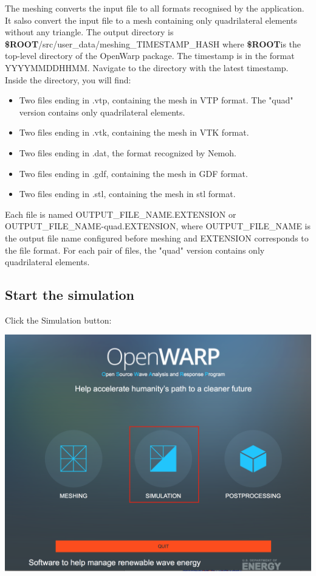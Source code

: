 \documentclass[12pt]{article}
\newcommand{\ROOT}{{\textbf{\$ROOT}}}
\begin{document}
	The meshing converts the input file to all formats recognised by the application. It salso convert the input file to a mesh containing only quadrilateral elements without any triangle.
The output directory is \ROOT/src/user_data/meshing_TIMESTAMP_HASH where 
\ROOT is the top-level directory of the OpenWarp package.
The timestamp is in the format YYYYMMDDHHMM. Navigate to the directory with the latest timestamp. Inside the directory, you will find:
\begin{itemize}
	\item Two files ending in .vtp, containing the mesh in VTP format. The "quad" version contains only quadrilateral elements.
	\item Two files ending in .vtk, containing the mesh in VTK format. 
	\item Two files ending in .dat, the format recognized by Nemoh. 
	
	\item 
	Two files ending in .gdf, containing the mesh in GDF format. 
	\item Two files ending in .stl, containing the mesh in stl format.
\end{itemize}

Each file is named OUTPUT_FILE_NAME.EXTENSION or OUTPUT_FILE_NAME-quad.EXTENSION, where OUTPUT_FILE_NAME is the output file name configured before meshing and EXTENSION corresponds to the file format.
For each pair of files, the "quad" version contains only quadrilateral elements.


\subsection{Start the simulation}
Click the Simulation button:

\vspace{\abovedisplayskip}
\begin{minipage}{\linewidth}
	\centering
	\includegraphics[scale=0.4]{img/25}
\end{minipage}
\vspace{\belowdisplayskip}
\end{document}
